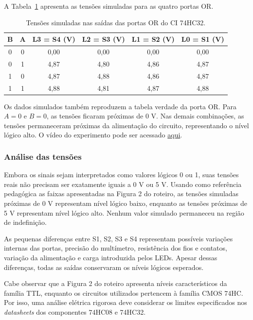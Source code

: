 \documentclass[12pt]{article}
\begin{document}
A Tabela~\ref{tab:or} apresenta as tensões simuladas para as quatro portas OR.

\begin{table}[H]
    \centering
    \caption{Tensões simuladas nas saídas das portas OR do CI 74HC32.}
    \label{tab:or}
    \begin{tabular}{|c|c|c|c|c|c|}
        \hline
        B & A & L3 = S4 (V) & L2 = S3 (V) & L1 = S2 (V) & L0 = S1 (V) \\
        \hline
        0 & 0 & 0,00 & 0,00 & 0,00 & 0,00 \\
        \hline
        0 & 1 & 4,87 & 4,80 & 4,86 & 4,87 \\
        \hline
        1 & 0 & 4,87 & 4,88 & 4,86 & 4,87 \\
        \hline
        1 & 1 & 4,88 & 4,81 & 4,87 & 4,88 \\
        \hline
    \end{tabular}
\end{table}

Os dados simulados também reproduzem a tabela verdade da porta OR. Para
$A=0$ e $B=0$, as tensões ficaram próximas de 0 V. Nas demais combinações,
as tensões permaneceram próximas da alimentação do circuito, representando o
nível lógico alto. O vídeo do experimento pode ser acessado \href{https://drive.google.com/file/d/1eVGJeG3TJrlJT-N0to8uFadk5Nuf4HiG/view?usp=drive_link}{aqui}.

\subsubsection{Análise das tensões}

Embora os sinais sejam interpretados como valores lógicos 0 ou 1, suas tensões
reais não precisam ser exatamente iguais a 0 V ou 5 V. Usando como referência
pedagógica as faixas apresentadas na Figura 2 do roteiro, as tensões simuladas
próximas de 0 V representam nível lógico baixo, enquanto as tensões próximas de
5 V representam nível lógico alto. Nenhum valor simulado permaneceu na região
de indefinição.

As pequenas diferenças entre S1, S2, S3 e S4 representam possíveis variações
internas das portas, precisão do multímetro, resistência dos fios e contatos,
variação da alimentação e carga introduzida pelos LEDs. Apesar dessas diferenças,
todas as saídas conservaram os níveis lógicos esperados.

Cabe observar que a Figura 2 do roteiro apresenta níveis característicos da
família TTL, enquanto os circuitos utilizados pertencem à família CMOS 74HC.
Por isso, uma análise elétrica rigorosa deve considerar os limites especificados
nos \textit{datasheets} dos componentes 74HC08 e 74HC32.
\end{document}
